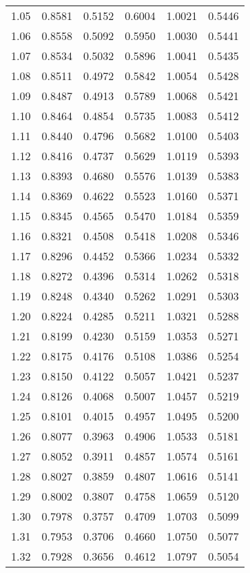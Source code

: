 \documentclass{article}
\begin{document}
\begin{longtable}{cccccc}
1.05 & 0.8581 & 0.5152 & 0.6004 & 1.0021 & 0.5446 \\
1.06 & 0.8558 & 0.5092 & 0.5950 & 1.0030 & 0.5441 \\
1.07 & 0.8534 & 0.5032 & 0.5896 & 1.0041 & 0.5435 \\
1.08 & 0.8511 & 0.4972 & 0.5842 & 1.0054 & 0.5428 \\
1.09 & 0.8487 & 0.4913 & 0.5789 & 1.0068 & 0.5421 \\
1.10 & 0.8464 & 0.4854 & 0.5735 & 1.0083 & 0.5412 \\
1.11 & 0.8440 & 0.4796 & 0.5682 & 1.0100 & 0.5403 \\
1.12 & 0.8416 & 0.4737 & 0.5629 & 1.0119 & 0.5393 \\
1.13 & 0.8393 & 0.4680 & 0.5576 & 1.0139 & 0.5383 \\
1.14 & 0.8369 & 0.4622 & 0.5523 & 1.0160 & 0.5371 \\
1.15 & 0.8345 & 0.4565 & 0.5470 & 1.0184 & 0.5359 \\
1.16 & 0.8321 & 0.4508 & 0.5418 & 1.0208 & 0.5346 \\
1.17 & 0.8296 & 0.4452 & 0.5366 & 1.0234 & 0.5332 \\
1.18 & 0.8272 & 0.4396 & 0.5314 & 1.0262 & 0.5318 \\
1.19 & 0.8248 & 0.4340 & 0.5262 & 1.0291 & 0.5303 \\
1.20 & 0.8224 & 0.4285 & 0.5211 & 1.0321 & 0.5288 \\
1.21 & 0.8199 & 0.4230 & 0.5159 & 1.0353 & 0.5271 \\
1.22 & 0.8175 & 0.4176 & 0.5108 & 1.0386 & 0.5254 \\
1.23 & 0.8150 & 0.4122 & 0.5057 & 1.0421 & 0.5237 \\
1.24 & 0.8126 & 0.4068 & 0.5007 & 1.0457 & 0.5219 \\
1.25 & 0.8101 & 0.4015 & 0.4957 & 1.0495 & 0.5200 \\
1.26 & 0.8077 & 0.3963 & 0.4906 & 1.0533 & 0.5181 \\
1.27 & 0.8052 & 0.3911 & 0.4857 & 1.0574 & 0.5161 \\
1.28 & 0.8027 & 0.3859 & 0.4807 & 1.0616 & 0.5141 \\
1.29 & 0.8002 & 0.3807 & 0.4758 & 1.0659 & 0.5120 \\
1.30 & 0.7978 & 0.3757 & 0.4709 & 1.0703 & 0.5099 \\
1.31 & 0.7953 & 0.3706 & 0.4660 & 1.0750 & 0.5077 \\
1.32 & 0.7928 & 0.3656 & 0.4612 & 1.0797 & 0.5054 \\

\end{longtable}
\end{document}
